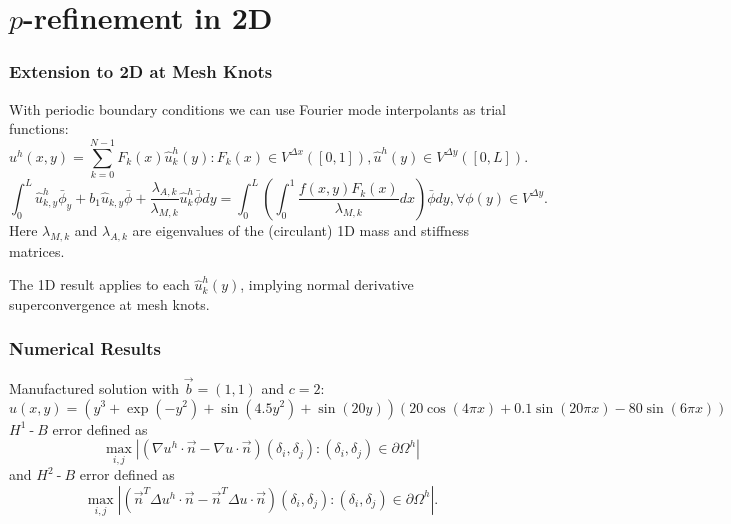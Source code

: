 \documentclass[8pt]{beamer}
\DeclareMathOperator{\hyphen}{-}
\begin{document}
\section{\(p\)-refinement in 2D}
    \begin{frame}
        \frametitle{Extension to 2D at Mesh Knots}
        With periodic boundary conditions we can use Fourier mode interpolants
        as trial functions:
        \begin{equation*}
            u^h(x, y) = \sum_{k = 0}^{N - 1} F_k(x) \hat{u}^h_k(y) :
            F_k(x) \in V^{\Delta x}([0, 1]),
            \hat{u}^h(y) \in V^{\Delta y}([0, L]).
        \end{equation*}
        \pause
        \begin{equation*}
            \int_0^L
            \hat{u}^h_{k, y} \bar{\phi}_y
            + b_1 \hat{u}_{k, y} \bar{\phi}
            + \dfrac{\lambda_{A, k}}{\lambda_{M, k}}
            \hat{u}^h_k \bar{\phi} dy
            =
            \int_0^L
            \left(
            \int_0^1
            \dfrac{f(x, y) F_k(x)}{\lambda_{M, k}} dx
            \right)
            \bar{\phi} dy,
            \forall \phi(y) \in V^{\Delta y}.
        \end{equation*}
        Here \(\lambda_{M,k}\) and \(\lambda_{A,k}\) are eigenvalues of the
        (circulant) 1D mass and stiffness matrices.
        \pause
        \begin{center}
            The 1D result applies to each \(\hat{u}^h_k(y)\), implying normal
            derivative superconvergence at mesh knots.
        \end{center}
    \end{frame}

\begin{frame}
    \frametitle{Numerical Results}
    Manufactured solution with \(\vec{b} = (1, 1)\) and \(c = 2\):
    \begin{equation*}
        u(x, y) = (y^3 + \exp(-y^2) + \sin(4.5 y^2) + \sin(20 y)) (20 \cos(4 \pi x)
        + 0.1 \sin(20 \pi x) - 80 \sin(6 \pi x))
    \end{equation*}
    \pause
    \(H^1{\hyphen}B\) error defined as
    \begin{equation*}
        \max_{i, j}
        \left|
        (\nabla u^h \cdot \vec{n} -
        \nabla u \cdot \vec{n})(\delta_i, \delta_j)
        : (\delta_i, \delta_j) \in \partial \Omega^h
        \right|
    \end{equation*}
    and \(H^2{\hyphen}B\) error defined as
    \begin{equation*}
        \max_{i, j}
        \left|
        (\vec{n}^T \Delta u^h \cdot \vec{n} -
        \vec{n}^T \Delta u \cdot \vec{n})(\delta_i, \delta_j)
        : (\delta_i, \delta_j) \in \partial \Omega^h
        \right|.
    \end{equation*}
\end{frame}
\end{document}
